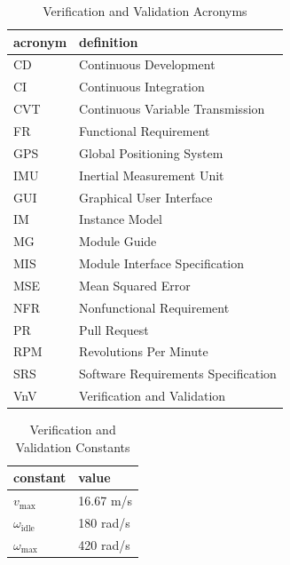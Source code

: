 \documentclass[12pt, titlepage]{article}
\begin{document}
\begin{table}[h]
  \raggedright
  \begin{tabular}{l l} 
    \toprule		
    \textbf{acronym} & \textbf{definition}\\
    \midrule
    CD & Continuous Development\\
    CI & Continuous Integration\\ 
    CVT & Continuous Variable Transmission\\
    FR & Functional Requirement\\
    GPS & Global Positioning System\\
    IMU & Inertial Measurement Unit\\
    GUI & Graphical User Interface\\
    IM & Instance Model\\
    MG & Module Guide\\
    MIS & Module Interface Specification\\
    MSE & Mean Squared Error\\
    NFR & Nonfunctional Requirement\\
    PR & Pull Request\\
    RPM & Revolutions Per Minute\\
    SRS & Software Requirements Specification\\
    VnV & Verification and Validation\\
    \bottomrule
  \end{tabular}
  \caption{Verification and Validation Acronyms}
  \label{tab:vnv_acronyms}
\end{table}

\begin{table}[h] %
  \raggedright
  \begin{tabular}{l l} 
    \toprule		
    \textbf{constant} & \textbf{value}\\
    \midrule
    $v_\text{max}$ & 16.67 m/s \\
    $\omega_{\text{idle}}$ & 180 rad/s \\
    $\omega_\text{max}$ & 420 rad/s \\
    \bottomrule
  \end{tabular}
  \caption{Verification and Validation Constants}
  \label{tab:vnv_constants}
\end{table}

\newpage

\end{document}
